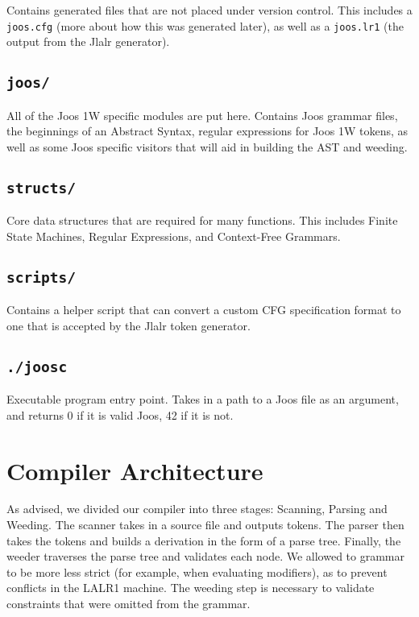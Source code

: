 \documentclass[12pt, a4paper]{article}
\begin{document}
Contains generated files that are not placed under version control. This includes a \verb|joos.cfg| (more about how this was generated later), as well as a \verb|joos.lr1| (the output from the Jlalr generator).

\subsection{\texttt{joos/}}

All of the Joos 1W specific modules are put here. Contains Joos grammar files, the beginnings of an Abstract Syntax, regular expressions for Joos 1W tokens, as well as some Joos specific visitors that will aid in building the AST and weeding.

\subsection{\texttt{structs/}}

Core data structures that are required for many functions. This includes Finite State Machines, Regular Expressions, and Context-Free Grammars.

\subsection{\texttt{scripts/}}

Contains a helper script that can convert a custom CFG specification format to one that is accepted by the Jlalr token generator.


\subsection{\texttt{./joosc}}

Executable program entry point. Takes in a path to a Joos file as an argument, and returns 0 if it is valid Joos, 42 if it is not.

\section{Compiler Architecture}

As advised, we divided our compiler into three stages: Scanning, Parsing and Weeding. The scanner takes in a source file and outputs tokens. The parser then takes the tokens and builds a derivation in the form of a parse tree. Finally, the weeder traverses the parse tree and validates each node. We allowed to grammar to be more less strict (for example, when evaluating modifiers), as to prevent conflicts in the LALR1 machine. The weeding step is necessary to validate constraints that were omitted from the grammar.
\end{document}
